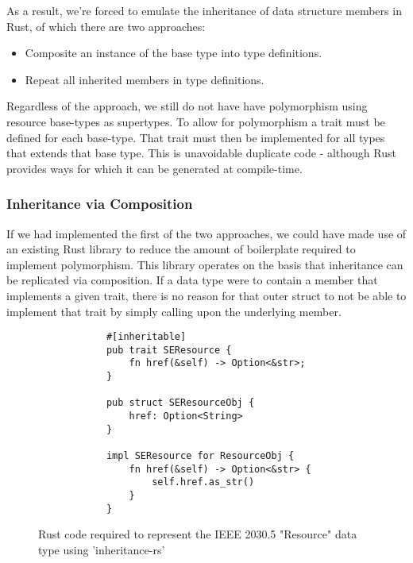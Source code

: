 As a result, we're forced to emulate the inheritance of data structure members in Rust, of which there are two approaches:

\begin{itemize}
    \item Composite an instance of the base type into type definitions.
    \item Repeat all inherited members in type definitions.
\end{itemize}

Regardless of the approach, we still do not have have polymorphism using resource base-types as supertypes.
To allow for polymorphism a trait must be defined for each base-type. That trait must then be implemented for all types that extends that base type. 
This is unavoidable duplicate code - although Rust provides ways for which it can be generated at compile-time.

\subsubsection{Inheritance via Composition}

If we had implemented the first of the two approaches, we could have made use of an existing Rust library to reduce the amount of boilerplate required to implement polymorphism.
This library operates on the basis that inheritance can be replicated via composition. If a data type were to contain a member that implements a given trait, there is no reason for that outer struct to not be able to implement that trait by simply calling upon the underlying member.


\begin{figure}[H]
    \begin{center}
        \begin{lstlisting}
            #[inheritable]
            pub trait SEResource {
                fn href(&self) -> Option<&str>;
            }

            pub struct SEResourceObj {
                href: Option<String>
            }

            impl SEResource for ResourceObj {
                fn href(&self) -> Option<&str> {
                    self.href.as_str()
                }
            }
        \end{lstlisting}
        \label{fig:resinher}
        \caption{Rust code required to represent the IEEE 2030.5 "Resource" data type using 'inheritance-rs'}
    \end{center}
\end{figure}


